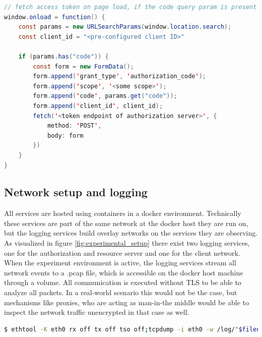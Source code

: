 \documentclass[
    fontsize=12pt,
    headings=small,
    parskip=half,           %
    bibliography=totoc,
    numbers=noenddot,       %
    open=any,               %
    ]{scrreprt}
\begin{document}
\begin{minipage}\linewidth
\begin{lstlisting}[language={java}, caption={Example implementation of authorization code handling at the client}, label={lst:redirect_handler}]
// fetch access token on page load, if the code query param is present
window.onload = function() {
	const params = new URLSearchParams(window.location.search);
	const client_id = "<pre-configured client ID>"

	if (params.has("code")) {
		const form = new FormData();
		form.append('grant_type', 'authorization_code');
		form.append('scope', '<some scope>');
		form.append('code', params.get("code"));
		form.append('client_id', client_id);
		fetch('<token endpoint of authorization server>', {
			method: 'POST',
			body: form
		})
	}
}
\end{lstlisting}
\end{minipage}

\subsection{Network setup and logging}
All services are hosted using containers in a docker environment. Technically these services are part of the same network at the docker host they are run on, but the logging services build overlay networks on the services they are observing. As visualized in figure \ref{fig:experimental_setup} there exist two logging services, one for the authorization and resource server and one for the client network. When the experiment environment is active, the logging services stream all network events to a .pcap file, which is accessible on the docker host machine through a volume. All communication is executed without TLS to be able to analyze all packets. In a real-world scenario this would not be the case, but mechanisms like proxies, who are acting as man-in-the middle would be able to inspect the network traffic unencrypted in that case as well.

\begin{minipage}\linewidth
\begin{lstlisting}[language={bash}, caption={Logger process}, label={lst:logging_service}] 
$ ethtool -K eth0 rx off tx off tso off;tcpdump -i eth0 -w /log/"$filename_prefix"-log-$(date +"%Y%m%d_%H-%M-%S").pcap
\end{lstlisting}
\end{minipage}
\end{document}
